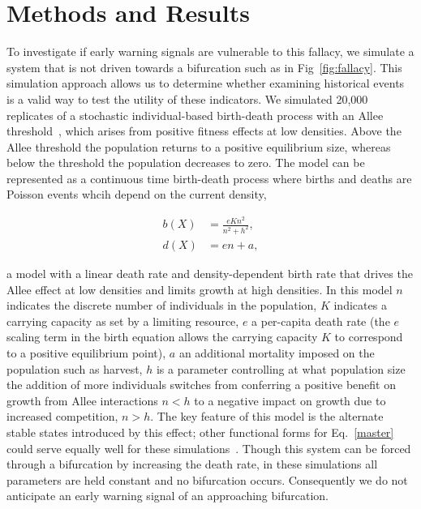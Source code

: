 \documentclass[authoryear,review,12pt]{elsarticle}
\begin{document}
\section{Methods and Results}
To investigate if early warning signals are vulnerable to this fallacy,
we simulate a system that is not driven towards a bifurcation such as
in Fig~\ref{fig:fallacy}.  This simulation approach allows us to determine whether
examining historical events is a valid way to test the utility of these
indicators.  We simulated 20,000 replicates of a stochastic individual-based
birth-death process with an Allee threshold~\citep{Courchamp2008}, which
arises from positive fitness effects at low densities.  Above the Allee
threshold the population returns to a positive equilibrium size, whereas
below the threshold the population decreases to zero. The model can be represented as a continuous time birth-death process where births and deaths are Poisson events whcih depend on the current density,

\begin{align}
    b(X) &= \frac{e K n^2}{n^2 + h^2}, \\
    d(X) &= e n + a,

\end{align}




a model with a linear death rate and density-dependent birth
rate that drives the Allee effect at low densities and limits
growth at high densities.  In this model $n$ indicates the discrete
number of individuals in the population, $K$ indicates a carrying 
capacity as set by a limiting resource, $e$ a per-capita death rate (the $e$ scaling term in the birth equation allows the carrying capacity $K$ to correspond to a positive equilibrium point), 
$a$ an additional mortality imposed on the population such as harvest,
$h$ is a parameter controlling at what population size the addition of 
more individuals switches from conferring a positive benefit on growth 
from Allee interactions $n < h$ to a negative impact on growth due to 
increased competition, $n > h$.  The key feature of this model is the
alternate stable states introduced by this effect; other functional
forms for Eq.~\eqref{master} could serve equally well for these
simulations~\citep[see \emph{e.g.}][]{Scheffer2001}.  Though this
system can be forced through a bifurcation by increasing
the death rate, in these simulations all parameters are held constant
and no bifurcation occurs.  Consequently we do not anticipate an early
warning signal of an approaching bifurcation.  
\end{document}

